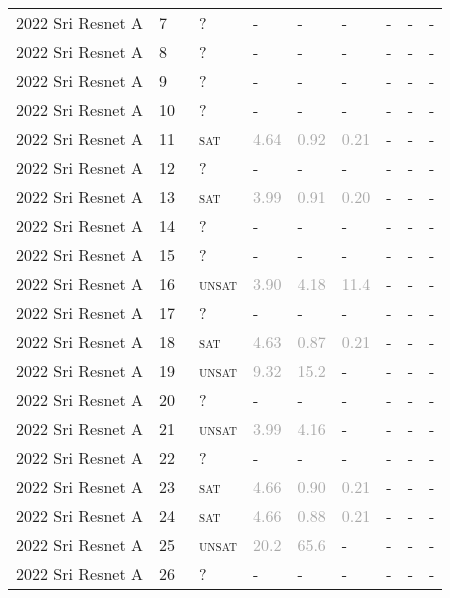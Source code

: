 \begin{center}
{\begin{longtable}{@{}lllllllll@{}}
2022 Sri Resnet A & 7 & ~? & - & - & - & - & - & - \\
2022 Sri Resnet A & 8 & ~? & - & - & - & - & - & - \\
2022 Sri Resnet A & 9 & ~? & - & - & - & - & - & - \\
2022 Sri Resnet A & 10 & ~? & - & - & - & - & - & - \\
2022 Sri Resnet A & 11 & ~\textsc{sat} & \textcolor{darkgray}{4.64} & \textcolor{darkgray}{0.92} & \textcolor{darkgray}{0.21} & - & - & - \\
2022 Sri Resnet A & 12 & ~? & - & - & - & - & - & - \\
2022 Sri Resnet A & 13 & ~\textsc{sat} & \textcolor{darkgray}{3.99} & \textcolor{darkgray}{0.91} & \textcolor{darkgray}{0.20} & - & - & - \\
2022 Sri Resnet A & 14 & ~? & - & - & - & - & - & - \\
2022 Sri Resnet A & 15 & ~? & - & - & - & - & - & - \\
2022 Sri Resnet A & 16 & ~\textsc{unsat} & \textcolor{darkgray}{3.90} & \textcolor{darkgray}{4.18} & \textcolor{darkgray}{11.4} & - & - & - \\
2022 Sri Resnet A & 17 & ~? & - & - & - & - & - & - \\
2022 Sri Resnet A & 18 & ~\textsc{sat} & \textcolor{darkgray}{4.63} & \textcolor{darkgray}{0.87} & \textcolor{darkgray}{0.21} & - & - & - \\
2022 Sri Resnet A & 19 & ~\textsc{unsat} & \textcolor{darkgray}{9.32} & \textcolor{darkgray}{15.2} & - & - & - & - \\
2022 Sri Resnet A & 20 & ~? & - & - & - & - & - & - \\
2022 Sri Resnet A & 21 & ~\textsc{unsat} & \textcolor{darkgray}{3.99} & \textcolor{darkgray}{4.16} & - & - & - & - \\
2022 Sri Resnet A & 22 & ~? & - & - & - & - & - & - \\
2022 Sri Resnet A & 23 & ~\textsc{sat} & \textcolor{darkgray}{4.66} & \textcolor{darkgray}{0.90} & \textcolor{darkgray}{0.21} & - & - & - \\
2022 Sri Resnet A & 24 & ~\textsc{sat} & \textcolor{darkgray}{4.66} & \textcolor{darkgray}{0.88} & \textcolor{darkgray}{0.21} & - & - & - \\
2022 Sri Resnet A & 25 & ~\textsc{unsat} & \textcolor{darkgray}{20.2} & \textcolor{darkgray}{65.6} & - & - & - & - \\
2022 Sri Resnet A & 26 & ~? & - & - & - & - & - & - \\

\end{longtable}}
\end{center}
